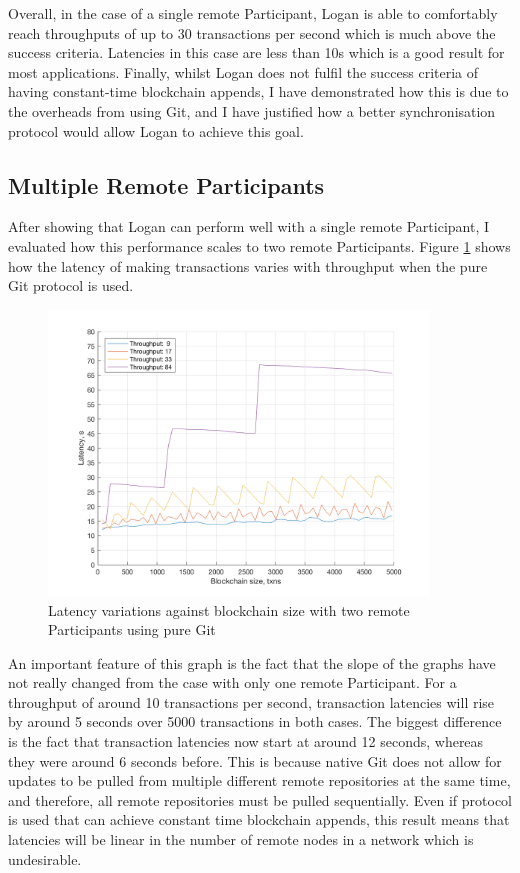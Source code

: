 \documentclass[12pt,a4paper,twoside,openright]{report}
\begin{document}
	Overall, in the case of a single remote Participant, Logan is able to comfortably reach throughputs of up to 30 transactions per second which is much above the success criteria. 
	Latencies in this case are less than 10s which is a good result for most applications.
	Finally, whilst Logan does not fulfil the success criteria of having constant-time blockchain appends, I have demonstrated how this is due to the overheads from using Git, and I have justified how a better synchronisation protocol would allow Logan to achieve this goal.

	\subsection{Multiple Remote Participants}
	After showing that Logan can perform well with a single remote Participant, I evaluated how this performance scales to two remote Participants.
	Figure \ref{figs:tworems} shows how the latency of making transactions varies with throughput when the pure Git protocol is used.
	\begin{figure}
		\centering
		\includegraphics[width=0.9\textwidth]{figs/2latencies_sizes_throughputs.png}
		\caption{Latency variations against blockchain size with two remote Participants using pure Git}
		\label{figs:tworems}
	\end{figure}
	An important feature of this graph is the fact that the slope of the graphs have not really changed from the case with only one remote Participant.
	For a throughput of around 10 transactions per second, transaction latencies will rise by around 5 seconds over 5000 transactions in both cases.
	The biggest difference is the fact that transaction latencies now start at around 12 seconds, whereas they were around 6 seconds before.
	This is because native Git does not allow for updates to be pulled from multiple different remote repositories at the same time, and therefore, all remote repositories must be pulled sequentially.
	Even if protocol is used that can achieve constant time blockchain appends, this result means that latencies will be linear in the number of remote nodes in a network which is undesirable. \\
\end{document}
